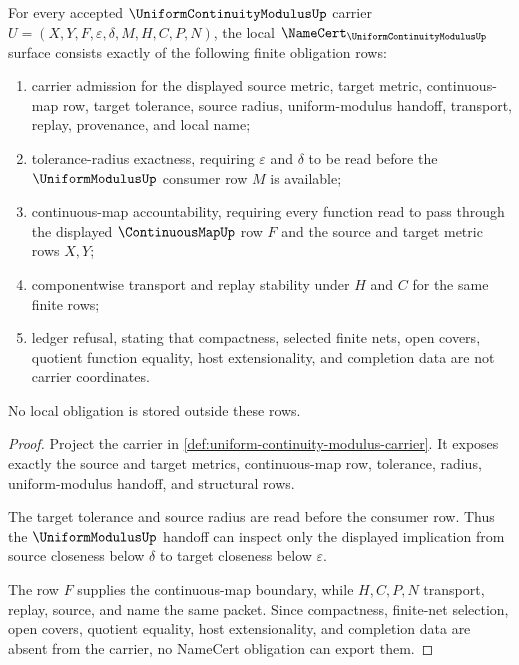 \begin{theorem}
\label{thm:uniform-continuity-modulus-namecert-obligations}
For every accepted $\UniformContinuityModulusUp$ carrier $U=(X,Y,F,\varepsilon,\delta,M,H,C,P,N)$, the local $\NameCert_{\UniformContinuityModulusUp}$ surface consists exactly of the following finite obligation rows:
\begin{enumerate}
\item carrier admission for the displayed source metric, target metric, continuous-map row, target tolerance, source radius, uniform-modulus handoff, transport, replay, provenance, and local name;
\item tolerance-radius exactness, requiring $\varepsilon$ and $\delta$ to be read before the $\UniformModulusUp$ consumer row $M$ is available;
\item continuous-map accountability, requiring every function read to pass through the displayed $\ContinuousMapUp$ row $F$ and the source and target metric rows $X,Y$;
\item componentwise transport and replay stability under $H$ and $C$ for the same finite rows;
\item ledger refusal, stating that compactness, selected finite nets, open covers, quotient function equality, host extensionality, and completion data are not carrier coordinates.
\end{enumerate}
No local obligation is stored outside these rows.
\end{theorem}
\begin{proof}
Project the carrier in \autoref{def:uniform-continuity-modulus-carrier}. It exposes exactly the source and target metrics, continuous-map row, tolerance, radius, uniform-modulus handoff, and structural rows.

The target tolerance and source radius are read before the consumer row. Thus the $\UniformModulusUp$ handoff can inspect only the displayed implication from source closeness below $\delta$ to target closeness below $\varepsilon$.

The row $F$ supplies the continuous-map boundary, while $H,C,P,N$ transport, replay, source, and name the same packet. Since compactness, finite-net selection, open covers, quotient equality, host extensionality, and completion data are absent from the carrier, no NameCert obligation can export them.
\end{proof}

